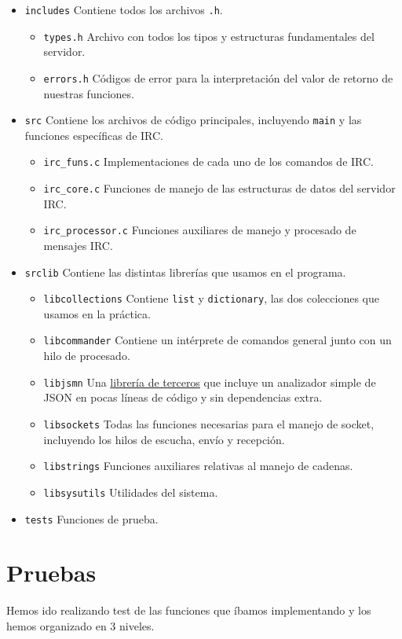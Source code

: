 \documentclass{article}
\begin{document}
\begin{itemize}
\item \texttt{includes} Contiene todos los archivos \texttt{.h}.
\begin{itemize}
\item \texttt{types.h} Archivo con todos los tipos y estructuras fundamentales del servidor.
\item \texttt{errors.h} Códigos de error para la interpretación del valor de retorno de nuestras funciones.
\end{itemize}
\item \texttt{src} Contiene los archivos de código principales, incluyendo \texttt{main} y las funciones específicas de IRC.
\begin{itemize}
\item \texttt{irc\_funs.c} Implementaciones de cada uno de los comandos de IRC.
\item \texttt{irc\_core.c} Funciones de manejo de las estructuras de datos del servidor IRC.
\item \texttt{irc\_processor.c} Funciones auxiliares de manejo y procesado de mensajes IRC.
\end{itemize}
\item \texttt{srclib} Contiene las distintas librerías que usamos en el programa.

\begin{itemize}
\item \texttt{libcollections} Contiene \texttt{list} y \texttt{dictionary}, las dos colecciones que usamos en la práctica.
\item \texttt{libcommander} Contiene un intérprete de comandos general junto con un hilo de procesado.
\item \texttt{libjsmn} Una \href{http://zserge.bitbucket.org/jsmn.html}{librería de terceros} que incluye un analizador simple de JSON en pocas líneas de código y sin dependencias extra.
\item \texttt{libsockets} Todas las funciones necesarias para el manejo de socket, incluyendo los hilos de escucha, envío y recepción.
\item \texttt{libstrings} Funciones auxiliares relativas al manejo de cadenas.
\item \texttt{libsysutils} Utilidades del sistema.
\end{itemize}
\item \texttt{tests} Funciones de prueba.
\end{itemize}

\section{Pruebas}
Hemos ido realizando test de las funciones que íbamos implementando y los hemos organizado en 3 niveles. 
\end{document}

